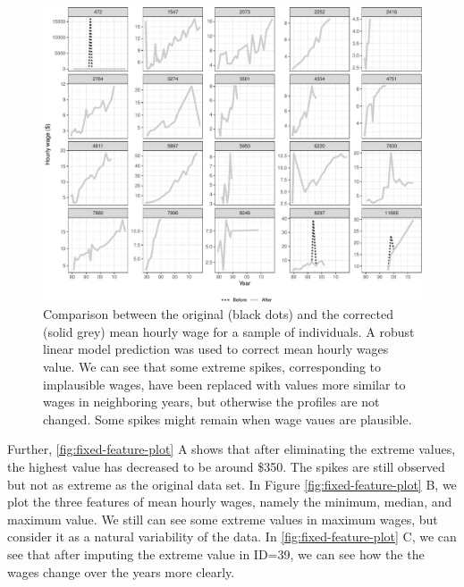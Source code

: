 \documentclass[12pt]{article}
\begin{document}
\begin{figure}

{\centering \includegraphics[width=0.9\linewidth]{figures/compare-plot-1} 

}

\caption{Comparison between the original (black dots) and the corrected (solid grey) mean hourly wage for a sample of individuals. A robust linear model prediction was used to correct mean hourly wages value. We can see that some extreme spikes, corresponding to implausible wages, have been replaced with values more similar to wages in neighboring years, but otherwise the profiles are not changed. Some spikes might remain when wage vaues are plausible.}\label{fig:compare-plot}
\end{figure}

Further, \ref{fig:fixed-feature-plot} A shows that after eliminating the extreme values, the highest value has decreased to be around \$350. The spikes are still observed but not as extreme as the original data set. In Figure \ref{fig:fixed-feature-plot} B, we plot the three features of mean hourly wages, namely the minimum, median, and maximum value. We still can see some extreme values in maximum wages, but consider it as a natural variability of the data. In \ref{fig:fixed-feature-plot} C, we can see that after imputing the extreme value in ID=39, we can see how the the wages change over the years more clearly.
\end{document}
